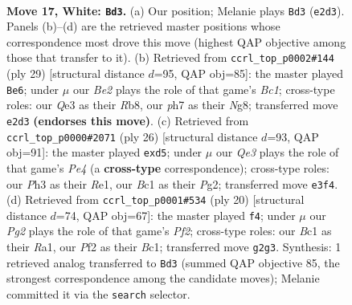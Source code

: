 \documentclass[11pt]{article}
\begin{document}
\clearpage

\begin{figure}[p]\centering
\begin{subfigure}{0.46\textwidth}\centering
\resizebox{\linewidth}{!}{%
\newchessgame
\chessboard[
  setfen={r1br2k1/ppp2p1p/3p4/4b1p1/N1P1Pn1q/4Q2P/PP2BPP1/R1B2R1K w - - 0 17},
  showmover=false,
  pgfstyle=straightmove, color=movearrow, markmove={e2-d3}
]}
\caption{}
\end{subfigure}\hfill
\begin{subfigure}{0.46\textwidth}\centering
\resizebox{\linewidth}{!}{%
\newchessgame
\chessboard[
  setfen={1rb1k1nr/2q2pbp/pNp3p1/2Ppp3/1P6/P7/1BP1QPPP/R3KB1R b KQk - 5 15},
  showmover=false,
  pgfstyle=straightmove, color=movearrow, markmove={c8-e6}
]}
\caption{}
\end{subfigure}
\\[4pt]
\begin{subfigure}{0.46\textwidth}\centering
\resizebox{\linewidth}{!}{%
\newchessgame
\chessboard[
  setfen={2r1kb1r/1b1p1ppp/p3p3/qp1n4/3QPP2/3BB3/PPP3PP/1K1RR3 w k - 0 14},
  showmover=false,
  pgfstyle=straightmove, color=movearrow, markmove={e4-d5}
]}
\caption{}
\end{subfigure}\hfill
\begin{subfigure}{0.46\textwidth}\centering
\resizebox{\linewidth}{!}{%
\newchessgame
\chessboard[
  setfen={r1b1k2r/pp1p1ppp/4p3/q3P3/1nPbQ3/2N5/PP3PPP/R1B1KB1R w KQkq - 0 11},
  showmover=false,
  pgfstyle=straightmove, color=movearrow, markmove={f2-f4}
]}
\caption{}
\end{subfigure}
\caption{\textbf{Move 17, White: \texttt{Bd3}.} (a) Our position; Melanie plays \texttt{Bd3} (\texttt{e2d3}). Panels (b)--(d) are the retrieved master positions whose correspondence most drove this move (highest QAP objective among those that transfer to it). (b) Retrieved from \texttt{ccrl\_top\_p0002\#144} (ply 29) [structural distance $d$=95, QAP obj=85]: the master played \texttt{Be6}; under $\mu$ our \emph{Be2} plays the role of that game's \emph{Bc1}; cross-type roles: our \emph{Q}e3 as their \emph{R}b8, our \emph{p}h7 as their \emph{N}g8; transferred move \texttt{e2d3} \textbf{(endorses this move)}. (c) Retrieved from \texttt{ccrl\_top\_p0000\#2071} (ply 26) [structural distance $d$=93, QAP obj=91]: the master played \texttt{exd5}; under $\mu$ our \emph{Qe3} plays the role of that game's \emph{Pe4} (a \textbf{cross-type} correspondence); cross-type roles: our \emph{P}h3 as their \emph{R}e1, our \emph{B}c1 as their \emph{P}g2; transferred move \texttt{e3f4}. (d) Retrieved from \texttt{ccrl\_top\_p0001\#534} (ply 20) [structural distance $d$=74, QAP obj=67]: the master played \texttt{f4}; under $\mu$ our \emph{Pg2} plays the role of that game's \emph{Pf2}; cross-type roles: our \emph{B}c1 as their \emph{R}a1, our \emph{P}f2 as their \emph{B}c1; transferred move \texttt{g2g3}. Synthesis: 1 retrieved analog transferred to \texttt{Bd3} (summed QAP objective 85, the strongest correspondence among the candidate moves); Melanie committed it via the \texttt{search} selector.}
\label{fig:thought-m32}
\end{figure}
\end{document}

